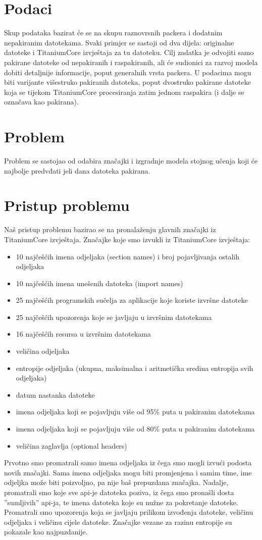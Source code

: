 \documentclass[conference]{IEEEtran}
\begin{document}
\section{Podaci}
Skup podataka bazirat će se na skupu raznovrsnih packera 
i dodatnim nepakiranim datotekama. Svaki primjer se sastoji 
od dva dijela: originalne datoteke i TitaniumCore izvještaja 
za tu datoteku. 
Cilj zadatka je odvojiti samo pakirane datoteke od 
nepakiranih i raspakiranih, ali će sudionici za razvoj 
modela dobiti detaljnije informacije, poput generalnih 
vrsta packera. U podacima mogu biti varijante višestruko 
pakiranih datoteka, poput dvostruko pakirane datoteke 
koja se tijekom TitaniumCore procesiranja zatim 
jednom raspakira (i dalje se označava kao pakirana).

\section{Problem}
Problem se sastojao od odabira značajki i izgradnje modela stojnog učenja koji će najbolje predvđati jeli dana datoteka pakirana.
\section{Pristup problemu}
Naš pristup problemu bazirao se na pronalaženju glavnih značajki iz TitaniumCore izvještaja.
Značajke koje smo izvukli iz TitaniumCore izvještaja:
\begin{itemize}
\item 10 najčešćih imena odjeljaka (section names) i broj pojavljivanja ostalih odjeljaka
\item 10 najčešćih imena unešenih datoteka (import names)
\item 25 najčešćih programskih sučelja za aplikacije koje koriste izvršne datoteke
\item 25 najčešćih upozorenja koje se javljaju u izvršnim datotekama
\item 16 najčešćih resursa u izvršnim datotekama
\item veličina odjeljaka
\item entropije odjeljaka (ukupna, maksimalna i aritmetička sredina entropija svih odjeljaka)\cite{b1}
\item datum nastanka datoteke
\item imena odjeljaka koji se pojavljuju više od 95\% puta u pakiranim datotekama
\item imena odjeljaka koji se pojavljuju više od 80\% puta u pakiranim datotekama
\item veličina zaglavlja (optional headers)
\end{itemize}
Prvotno smo promatrali samo imena odjeljaka iz čega smo mogli izvući podosta novih značajki. Sama imena odjeljaka mogu biti promjenjena i samim time, ime odjeljka može biti poizvoljno, pa nije baš prepuzdana značajka. Nadalje, promatrali smo koje sve api-je datoteka poziva, iz čega smo pronašli dosta ''sumljivih'' api-ja, te imena datoteka koje su nužne za pokretanje datoteke.  Promatrali smo upozorenja koja se javljaju prilikom izvođenja datoteke, veličinu odjeljaka i veličinu cijele datoteke.
Značajke vezane za razinu entropije su pokazale kao najpuzdanije.
\end{document}
